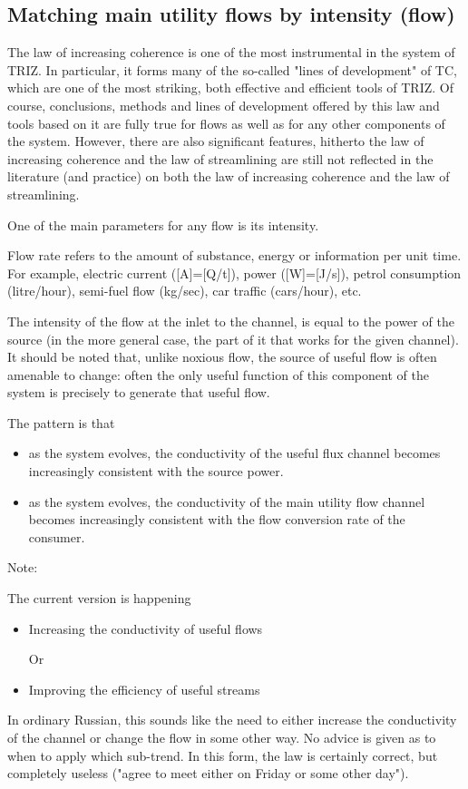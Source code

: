 \documentclass[a4paper,11pt]{article}
\begin{document}
\subsection{Matching main utility flows by intensity (flow)}

The law of increasing coherence is one of the most instrumental in the system
of TRIZ. In particular, it forms many of the so-called "lines of development"
of TC, which are one of the most striking, both effective and efficient tools
of TRIZ. Of course, conclusions, methods and lines of development offered by
this law and tools based on it are fully true for flows as well as for any
other components of the system. However, there are also significant features,
hitherto the law of increasing coherence and the law of streamlining are still
not reflected in the literature (and practice) on both the law of increasing
coherence and the law of streamlining.

One of the main parameters for any flow is its intensity.

Flow rate refers to the amount of substance, energy or information per unit
time. For example, electric current ([A]=[Q/t]), power ([W]=[J/s]), petrol
consumption (litre/hour), semi-fuel flow (kg/sec), car traffic (cars/hour),
etc.

The intensity of the flow at the inlet to the channel, is equal to the power
of the source (in the more general case, the part of it that works for the
given channel). It should be noted that, unlike noxious flow, the source of
useful flow is often amenable to change: often the only useful function of
this component of the system is precisely to generate that useful flow.

The pattern is that
\begin{itemize}
\item as the system evolves, the conductivity of the useful flux channel
  becomes increasingly consistent with the source power.
\item as the system evolves, the conductivity of the main utility flow channel
  becomes increasingly consistent with the flow conversion rate of the
  consumer.
\end{itemize}
Note:

The current version is happening
\begin{itemize}
\item Increasing the conductivity of useful flows

  Or

\item Improving the efficiency of useful streams
\end{itemize}
In ordinary Russian, this sounds like the need to either increase the
conductivity of the channel or change the flow in some other way. No advice is
given as to when to apply which sub-trend. In this form, the law is certainly
correct, but completely useless ("agree to meet either on Friday or some other
day").
\end{document}
